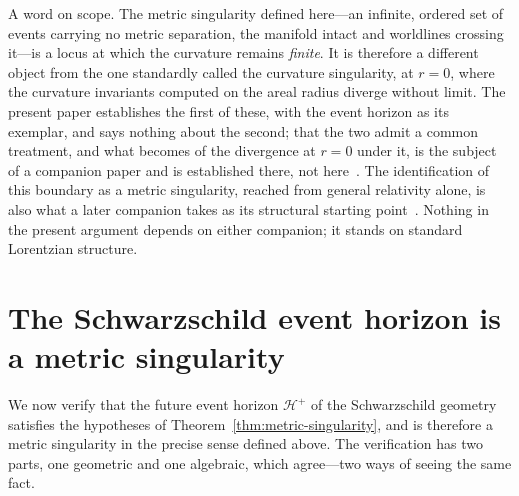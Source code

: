 \documentclass[11pt,a4paper]{article}
\theoremstyle{plain}
\theoremstyle{remark}
\begin{document}
A word on scope. The metric singularity defined here---an infinite, ordered set of events carrying no metric separation, the manifold intact and worldlines crossing it---is a locus at which the curvature remains \emph{finite}. It is therefore a different object from the one standardly called the curvature singularity, at $r=0$, where the curvature invariants computed on the areal radius diverge without limit. The present paper establishes the first of these, with the event horizon as its exemplar, and says nothing about the second; that the two admit a common treatment, and what becomes of the divergence at $r=0$ under it, is the subject of a companion paper and is established there, not here~\cite{JanzenCircle}. The identification of this boundary as a metric singularity, reached from general relativity alone, is also what a later companion takes as its structural starting point~\cite{JanzenGeometricCore}. Nothing in the present argument depends on either companion; it stands on standard Lorentzian structure.

\section{The Schwarzschild event horizon is a metric singularity}\label{sec:3}
We now verify that the future event horizon $\mathcal{H}^+$ of the Schwarzschild geometry satisfies the hypotheses of Theorem~\ref{thm:metric-singularity}, and is therefore a metric singularity in the precise sense defined above. The verification has two parts, one geometric and one algebraic, which agree---two ways of seeing the same fact.
\end{document}
